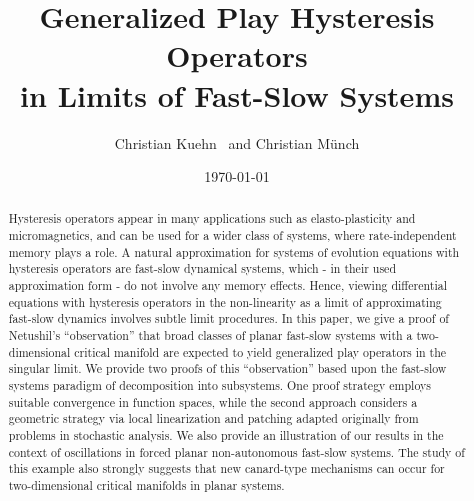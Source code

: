 \documentclass[12pt]{article}
\begin{document}
\title{Generalized Play Hysteresis Operators\\ in Limits of Fast-Slow Systems}

\author{Christian Kuehn\footnotemark[1]~
and Christian M\"unch\footnotemark[2]}
\date{\today}

\maketitle

\renewcommand{\thefootnote}{\fnsymbol{footnote}}


\begin{abstract}
Hysteresis operators appear in many applications such as elasto-plasticity
and micromagnetics, and can be used for a wider class of systems, where rate-independent 
memory plays a role. A natural approximation for systems of evolution equations with hysteresis 
operators are fast-slow
dynamical systems, which - in their used approximation form - do not involve any memory
effects. Hence, viewing differential equations with hysteresis operators in the non-linearity 
as a limit of approximating fast-slow dynamics
involves subtle limit procedures. In this paper, we give a proof of Netushil's ``observation'' 
that broad classes of planar fast-slow systems with a two-dimensional critical manifold 
are expected to yield generalized play operators in the singular limit. We 
provide two proofs of this ``observation'' based upon the fast-slow systems paradigm
of decomposition into subsystems. One proof strategy employs suitable convergence 
in function spaces, while the second approach considers a geometric
strategy via local linearization and patching adapted originally from problems in stochastic
analysis. We also provide an illustration of our results
in the context of oscillations in forced planar non-autonomous fast-slow systems. The study
of this example also strongly suggests that new canard-type mechanisms can occur for 
two-dimensional critical manifolds in planar systems.
\end{abstract}
\end{document}
